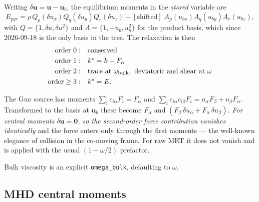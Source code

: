 \documentclass[11pt,a4paper]{article}
\newcommand{\code}[1]{\texttt{\small #1}}
\newcommand{\uu}{\bm{u}}
\begin{document}
Writing $\delta\uu = \uu - \uu_b$, the equilibrium moments in the \emph{stored}
variable are
\begin{equation}
  E_{pqr} = \rho\,Q_p(\delta u_x)Q_q(\delta u_y)Q_r(\delta u_z)
          - [\text{shifted}]\;A_p(u_{bx})A_q(u_{by})A_r(u_{bz}),
\end{equation}
with $Q=\{1,\delta u,\delta u^2\}$ and $A=\{1,-u_b,u_b^2\}$ for the product
basis, which since 2026-09-18 is the only basis in the tree.
The relaxation is then
\begin{equation}
\begin{aligned}
  \text{order }0:&\quad \text{conserved} \\
  \text{order }1:&\quad k^{\star} = k + F_\alpha \\
  \text{order }2:&\quad \text{trace at }\omega_{\rm bulk},\ \text{deviatoric and shear at }\omega \\
  \text{order}\geq3:&\quad k^{\star} = E .
\end{aligned}
\end{equation}

The Guo source has moments $\sum_i c_{i\alpha}F_i = F_\alpha$ and
$\sum_i c_{i\alpha}c_{i\beta}F_i = u_\alpha F_\beta + u_\beta F_\alpha$.
Transformed to the basis at $\uu_b$ these become $F_\alpha$ and
$(F_\beta\,\delta u_\alpha + F_\alpha\,\delta u_\beta)$. \emph{For central moments
$\delta\uu=\bm0$, so the second-order force contribution vanishes identically}
and the force enters only through the first moments --- the well-known elegance
of collision in the co-moving frame. For raw MRT it does not vanish and is
applied with the usual $(1-\omega/2)$ prefactor.

Bulk viscosity is an explicit \code{omega\_bulk}, defaulting to $\omega$.

\subsection{MHD central moments}
\label{sec:mhdcm}
\end{document}
